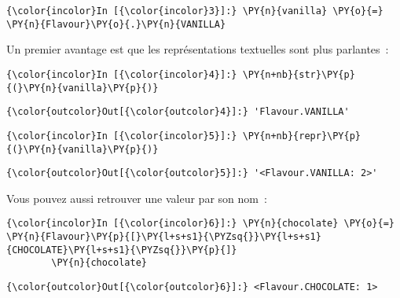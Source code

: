     \begin{Verbatim}[commandchars=\\\{\},frame=single,framerule=0.3mm,rulecolor=\color{cellframecolor}]
{\color{incolor}In [{\color{incolor}3}]:} \PY{n}{vanilla} \PY{o}{=} \PY{n}{Flavour}\PY{o}{.}\PY{n}{VANILLA}
\end{Verbatim}


    Un premier avantage est que les représentations textuelles sont plus
parlantes~:

    \begin{Verbatim}[commandchars=\\\{\},frame=single,framerule=0.3mm,rulecolor=\color{cellframecolor}]
{\color{incolor}In [{\color{incolor}4}]:} \PY{n+nb}{str}\PY{p}{(}\PY{n}{vanilla}\PY{p}{)}
\end{Verbatim}


\begin{Verbatim}[commandchars=\\\{\},frame=single,framerule=0.3mm,rulecolor=\color{cellframecolor}]
{\color{outcolor}Out[{\color{outcolor}4}]:} 'Flavour.VANILLA'
\end{Verbatim}
            
    \begin{Verbatim}[commandchars=\\\{\},frame=single,framerule=0.3mm,rulecolor=\color{cellframecolor}]
{\color{incolor}In [{\color{incolor}5}]:} \PY{n+nb}{repr}\PY{p}{(}\PY{n}{vanilla}\PY{p}{)}
\end{Verbatim}


\begin{Verbatim}[commandchars=\\\{\},frame=single,framerule=0.3mm,rulecolor=\color{cellframecolor}]
{\color{outcolor}Out[{\color{outcolor}5}]:} '<Flavour.VANILLA: 2>'
\end{Verbatim}
            
    Vous pouvez aussi retrouver une valeur par son nom~:

    \begin{Verbatim}[commandchars=\\\{\},frame=single,framerule=0.3mm,rulecolor=\color{cellframecolor}]
{\color{incolor}In [{\color{incolor}6}]:} \PY{n}{chocolate} \PY{o}{=} \PY{n}{Flavour}\PY{p}{[}\PY{l+s+s1}{\PYZsq{}}\PY{l+s+s1}{CHOCOLATE}\PY{l+s+s1}{\PYZsq{}}\PY{p}{]}
        \PY{n}{chocolate}
\end{Verbatim}


\begin{Verbatim}[commandchars=\\\{\},frame=single,framerule=0.3mm,rulecolor=\color{cellframecolor}]
{\color{outcolor}Out[{\color{outcolor}6}]:} <Flavour.CHOCOLATE: 1>
\end{Verbatim}
            
